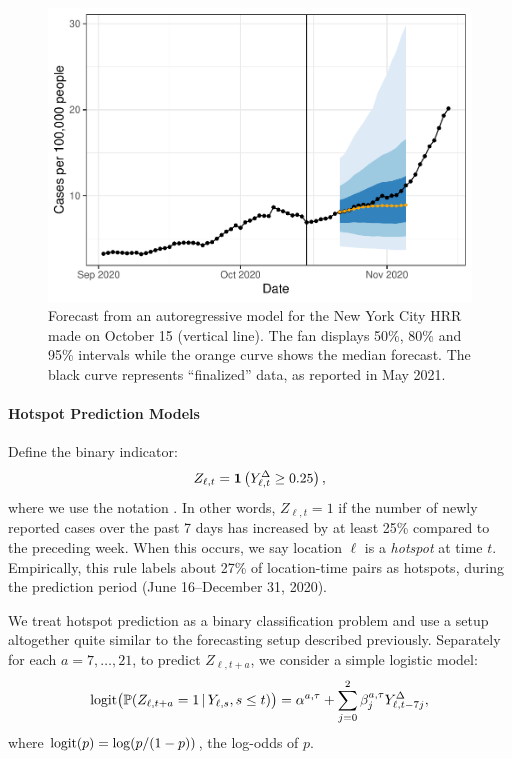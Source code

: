 \documentclass[9pt,twocolumn,twoside,lineno]{pnas-new}
\begin{document}
\begin{figure}[t]
\includegraphics[width=\columnwidth]{fig/trajectory.pdf}
\caption{Forecast from an autoregressive model for the New York City HRR made 
  on October 15 (vertical line).  The fan displays 50\%, 80\% and 95\% intervals
  while the orange curve shows the median forecast. The black curve represents
  ``finalized'' data, as reported in May 2021.} 
\label{fig:trajectory}
\end{figure}

\paragraph{Hotspot Prediction Models}

Define the binary indicator:
$$
Z_{\ell,t} = \mathbf{1}\left(Y^\Delta_{\ell,t} \geq 0.25\right),
$$
where we use the notation . In other words, $Z_{\ell,t}=1$ if the number of
newly reported cases over the past 7 days has increased by at least 25\%
compared to the preceding week.  When this occurs, we say location $\ell$ is a
\textit{hotspot} at time $t$.  Empirically, this rule labels about 27\% of
location-time pairs as hotspots, during the prediction period (June 16--December
31, 2020).   

We treat hotspot prediction as a binary classification problem and use a setup 
altogether quite similar to the forecasting setup described previously.
Separately for each $a=7,\ldots,21$, to predict $Z_{\ell,t+a}$, we consider a
simple logistic model:
\begin{equation}
\label{eq:hotspot_ar}
\mathrm{logit} \big( \mathbb{P}(Z_{\ell,t+a} = 1 \,|\, Y_{\ell,s}, s \leq t) \big) 
= \alpha^{a,\tau} + \sum_{j=0}^2 \beta^{a,\tau}_j Y^\Delta_{\ell,t-7j},
\end{equation}
where $\mathrm{logit}(p) = \log(p/(1-p))$, the log-odds of $p$.
\end{document}
